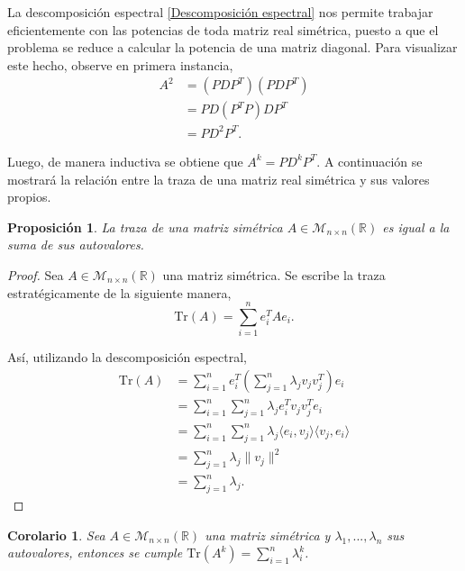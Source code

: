 \documentclass{article}[14pts]
\newtheorem{prop}{Proposición}
\newtheorem{corolario}{Corolario}
\providecommand{\norm}[1]{\lVert#1\rVert}
\newcommand{\Tr}{\mathrm{Tr}}
\providecommand{\norm}[1]{\lVert#1\rVert}
\begin{document}
La descomposición espectral \eqref{Descomposición espectral} nos permite trabajar eficientemente con las potencias de toda matriz real simétrica, puesto a que el problema se reduce a calcular la potencia de una matriz diagonal. Para visualizar este hecho, observe en primera instancia,
\begin{align*}
    A^{2} &= (PDP^{T})(PDP^{T})\\
    &= PD(P^{T}P)DP^{T}\\
    &= PD^{2}P^{T}.
\end{align*}

Luego, de manera inductiva se obtiene que $A^{k} = PD^{k}P^{T}$. A continuación se mostrará la relación entre la traza de una matriz real simétrica y sus valores propios.

\begin{prop} \label{lema_2} %
    La traza de una matriz simétrica $A\in \mathcal{M}_{n\times n}(\mathbb{R})$ es igual a la suma de sus autovalores.
\end{prop}

\begin{proof}
    Sea $A\in \mathcal{M}_{n\times n}(\mathbb{R})$ una matriz simétrica. Se escribe la traza estratégicamente de la siguiente manera,
    \[ 
        \Tr (A) = \sum_{i = 1}^{n} e_{i}^{T} A e_{i}.
    \]

    Así, utilizando la descomposición espectral,
    \begin{align*}
        \Tr(A) &= \sum_{i = 1}^{n}e_{i}^{T} \left( \sum_{j = 1}^{n} \lambda_{j}v_{j}v_{j}^{T} \right) e_{i}\\
        &= \sum_{i = 1}^{n}\sum_{j = 1}^{n} \lambda_{j} e_{i}^{T} v_{j} v_{j}^{T} e_{i}\\
        &= \sum_{i = 1}^{n}\sum_{j = 1}^{n} \lambda_{j} \langle e_{i}, v_{j}\rangle \langle v_{j}, e_{i}\rangle\\
        &= \sum_{j = 1}^{n} \lambda_{j} \norm{v_j}^{2}\\
        &= \sum_{j = 1}^{n} \lambda_{j}.
    \end{align*}
\end{proof}

\begin{corolario} \label{Tr_Ak}
    Sea $A \in\mathcal{M}_{n\times n}(\mathbb{R})$ una matriz simétrica y $\lambda_1 ,...,\lambda_n$ sus autovalores, entonces se cumple $\Tr(A^{k}) = \sum_{i = 1}^{n}\lambda_{i}^{k}$.
\end{corolario}
\end{document}

